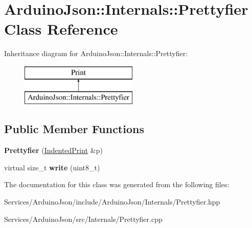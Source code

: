 \hypertarget{class_arduino_json_1_1_internals_1_1_prettyfier}{}\section{Arduino\+Json\+:\+:Internals\+:\+:Prettyfier Class Reference}
\label{class_arduino_json_1_1_internals_1_1_prettyfier}
Inheritance diagram for Arduino\+Json\+:\+:Internals\+:\+:Prettyfier\+:\begin{figure}[H]
\begin{center}
\leavevmode
\includegraphics[height=2.000000cm]{class_arduino_json_1_1_internals_1_1_prettyfier}
\end{center}
\end{figure}
\subsection*{Public Member Functions}
\begin{DoxyCompactItemize}
\item 
\hypertarget{class_arduino_json_1_1_internals_1_1_prettyfier_acefa5f4571cc75c854ae41032be2a0db}{}{\bfseries Prettyfier} (\hyperlink{class_arduino_json_1_1_internals_1_1_indented_print}{Indented\+Print} \&p)\label{class_arduino_json_1_1_internals_1_1_prettyfier_acefa5f4571cc75c854ae41032be2a0db}

\item 
\hypertarget{class_arduino_json_1_1_internals_1_1_prettyfier_af532eac1f8b66a6b9270a873d4af0e56}{}virtual size\+\_\+t {\bfseries write} (uint8\+\_\+t)\label{class_arduino_json_1_1_internals_1_1_prettyfier_af532eac1f8b66a6b9270a873d4af0e56}

\end{DoxyCompactItemize}


The documentation for this class was generated from the following files\+:\begin{DoxyCompactItemize}
\item 
Services/\+Arduino\+Json/include/\+Arduino\+Json/\+Internals/Prettyfier.\+hpp\item 
Services/\+Arduino\+Json/src/\+Internals/Prettyfier.\+cpp\end{DoxyCompactItemize}

